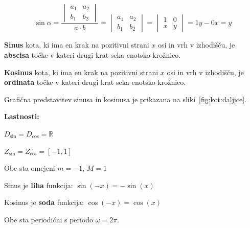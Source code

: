 \documentclass[a4paper,oneside,12pt,fleqn]{article}
\def\R{\ensuremath{\mathbb R}}
\newcommand\krat\cdot
\def\kos{\cos}
\numberwithin{equation}{section}
\newenvironment{enumerate*}%
{
\vspace{-12pt}%
\begin{enumerate}%
\setlength{\itemsep}{0pt}%
\setlength{\parskip}{2pt}}%
{\end{enumerate}}
\begin{document}
\begin{equation}
  \sin\alpha = \frac{\begin{vmatrix} a_1 & a_2 \\ b_1 & b_2 \end{vmatrix}}{a\krat b} =
  \begin{vmatrix} a_1 & a_2 \\ b_1 & b_2 \end{vmatrix} =
  \begin{vmatrix} 1 & 0 \\ x & y \end{vmatrix} = 1y - 0x = y
  \label{eq:kot:sindef}
\end{equation}


\textbf{Sinus} kota, ki ima en krak na pozitivni strani $x$ osi in vrh v izhodišču, je
\textbf{abscisa} točke v kateri drugi krat seka enotsko krožnico.

\textbf{Kosinus} kota, ki ima en krak na pozitivni strani $x$ osi in vrh v izhodišču, je
\textbf{ordinata} točke v kateri drugi krat seka enotsko krožnico.

Grafična predstavitev sinusa in kosinusa je prikazana na sliki~\ref{fig:kot:daljice}.

\textbf{Lastnosti:}
\begin{enumerate*}
  \item $D_{\sin} = D_{\cos} = \R$
  \item $Z_{\sin} = Z_{\cos} = [-1,1]$
  \item Obe sta omejeni $m = -1$, $M = 1$
  \item Sinus je \textbf{liha} funkcija: $\sin(-x) = -\sin(x)$
  \item Kosinus je \textbf{soda} funkcija: $\kos(-x) = \kos(x)$
  \item Obe sta periodični s periodo $\omega = 2\pi$.
\end{enumerate*}
\end{document}

